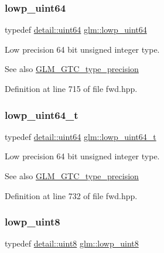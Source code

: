 \subsubsection{\texorpdfstring{lowp\_uint64}{lowp\_uint64}}
{\footnotesize\ttfamily typedef \mbox{\hyperlink{namespaceglm_1_1detail_adec4b19bf4982125e122db2fe03c5810}{detail\+::uint64}} \mbox{\hyperlink{group__gtc__type__precision_gacf666a9d9b309c4615c7a4f2ab0be289}{glm\+::lowp\+\_\+uint64}}}

Low precision 64 bit unsigned integer type. \begin{DoxySeeAlso}{See also}
\mbox{\hyperlink{group__gtc__type__precision}{G\+L\+M\+\_\+\+G\+T\+C\+\_\+type\+\_\+precision}} 
\end{DoxySeeAlso}


Definition at line 715 of file fwd.\+hpp.

\mbox{\label{group__gtc__type__precision_gabf3069d4f188557a87b1d7f35eb0a270}} 
\subsubsection{\texorpdfstring{lowp\_uint64\_t}{lowp\_uint64\_t}}
{\footnotesize\ttfamily typedef \mbox{\hyperlink{namespaceglm_1_1detail_adec4b19bf4982125e122db2fe03c5810}{detail\+::uint64}} \mbox{\hyperlink{group__gtc__type__precision_gabf3069d4f188557a87b1d7f35eb0a270}{glm\+::lowp\+\_\+uint64\+\_\+t}}}

Low precision 64 bit unsigned integer type. \begin{DoxySeeAlso}{See also}
\mbox{\hyperlink{group__gtc__type__precision}{G\+L\+M\+\_\+\+G\+T\+C\+\_\+type\+\_\+precision}} 
\end{DoxySeeAlso}


Definition at line 732 of file fwd.\+hpp.

\mbox{\label{group__gtc__type__precision_ga4d9dc08b7b248a386dfe9afd00fc6b1e}} 
\subsubsection{\texorpdfstring{lowp\_uint8}{lowp\_uint8}}
{\footnotesize\ttfamily typedef \mbox{\hyperlink{namespaceglm_1_1detail_aef2588f97d090cc19fbbe0c74fe17c8f}{detail\+::uint8}} \mbox{\hyperlink{group__gtc__type__precision_ga4d9dc08b7b248a386dfe9afd00fc6b1e}{glm\+::lowp\+\_\+uint8}}}

